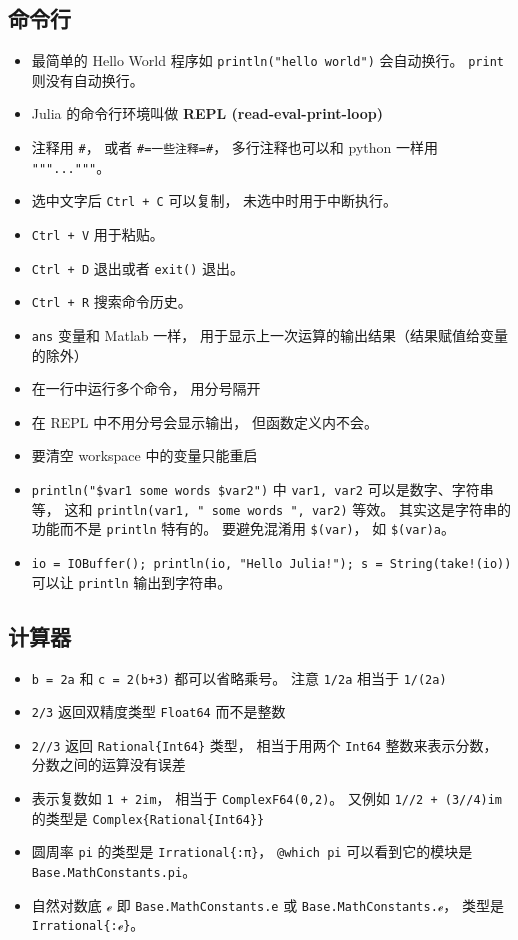 \subsection{命令行}
\begin{itemize}
\item 最简单的 Hello World 程序如 \verb`println("hello world")` 会自动换行。 \verb`print` 则没有自动换行。
\item Julia 的命令行环境叫做 \textbf{REPL (read-eval-print-loop)}
\item 注释用 \verb`#`， 或者 \verb`#=一些注释=#`， 多行注释也可以和 python 一样用 \verb`"""..."""`。
\item 选中文字后 \verb`Ctrl + C` 可以复制， 未选中时用于中断执行。
\item \verb`Ctrl + V` 用于粘贴。
\item \verb`Ctrl + D` 退出或者 \verb`exit()` 退出。
\item \verb`Ctrl + R` 搜索命令历史。
\item \verb`ans` 变量和 Matlab 一样， 用于显示上一次运算的输出结果（结果赋值给变量的除外）
\item 在一行中运行多个命令， 用分号隔开
\item 在 REPL 中不用分号会显示输出， 但函数定义内不会。
\item 要清空 workspace 中的变量只能重启
\item \verb`println("$var1 some words $var2")` 中 \verb`var1, var2` 可以是数字、字符串等， 这和 \verb`println(var1, " some words ", var2)` 等效。 其实这是字符串的功能而不是 \verb`println` 特有的。 要避免混淆用 \verb`$(var)`， 如 \verb`$(var)a`。
\item \verb`io = IOBuffer(); println(io, "Hello Julia!"); s = String(take!(io))` 可以让 \verb`println` 输出到字符串。
\end{itemize}

\subsection{计算器}
\begin{itemize}
\item \verb`b = 2a` 和 \verb`c = 2(b+3)` 都可以省略乘号。 注意 \verb`1/2a` 相当于 \verb`1/(2a)`
\item \verb`2/3` 返回双精度类型 \verb`Float64` 而不是整数
\item \verb`2//3` 返回 \verb`Rational{Int64}` 类型， 相当于用两个 \verb`Int64` 整数来表示分数， 分数之间的运算没有误差
\item 表示复数如 \verb`1 + 2im`， 相当于 \verb`ComplexF64(0,2)`。 又例如 \verb`1//2 + (3//4)im` 的类型是 \verb`Complex{Rational{Int64}}`
\item 圆周率 \verb`pi` 的类型是 \verb`Irrational{:π}`， \verb`@which pi` 可以看到它的模块是 \verb`Base.MathConstants.pi`。
\item 自然对数底 \verb`ℯ` 即 \verb`Base.MathConstants.e` 或 \verb`Base.MathConstants.ℯ`， 类型是 \verb`Irrational{:ℯ}`。
\end{itemize}

